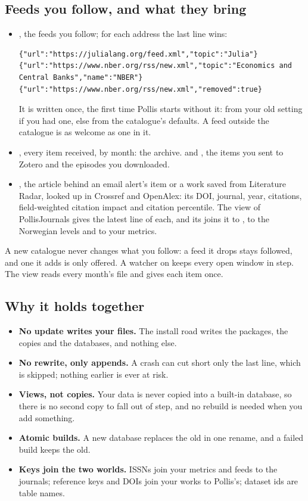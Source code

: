 \subsection{Feeds you follow, and what they bring}\label{sec:your-feeds}
\begin{itemize}
  \item {}, the feeds you follow; for each address the last line wins:
\begin{lstlisting}
{"url":"https://julialang.org/feed.xml","topic":"Julia"}
{"url":"https://www.nber.org/rss/new.xml","topic":"Economics and Central Banks","name":"NBER"}
{"url":"https://www.nber.org/rss/new.xml","removed":true}
\end{lstlisting}
    It is written once, the first time Pollis starts without it: from your old setting  if you had one,
    else from the catalogue's defaults. A feed outside the catalogue is as welcome as one in it.
  \item {}, every item received, by month: the archive.  and
    , the items you sent to Zotero and the episodes you downloaded.
  \item {}, the article behind an email alert's item or a work saved from
    Literature Radar, looked up in Crossref and OpenAlex: its DOI, journal, year, citations, field-weighted citation
    impact and citation percentile. The view  of PollisJournals gives the latest line of each, and its
     joins it to , to the Norwegian levels and to your metrics.
\end{itemize}
A new catalogue never changes what you follow: a feed it drops stays followed, and one it adds is only offered. A
watcher on  keeps every open window in step. The view  reads every month's file and
gives each item once.

\subsection{Why it holds together}
\begin{itemize}
  \item \textbf{No update writes your files.} The install road writes the packages, the copies and the databases, and
    nothing else.
  \item \textbf{No rewrite, only appends.} A crash can cut short only the last line, which is skipped; nothing earlier
    is ever at risk.
  \item \textbf{Views, not copies.} Your data is never copied into a built-in database, so there is no second copy to
    fall out of step, and no rebuild is needed when you add something.
  \item \textbf{Atomic builds.} A new database replaces the old in one rename, and a failed build keeps the old.
  \item \textbf{Keys join the two worlds.} ISSNs join your metrics and feeds to the journals; reference keys and DOIs
    join your works to Pollis's; dataset ids are table names.
\end{itemize}

